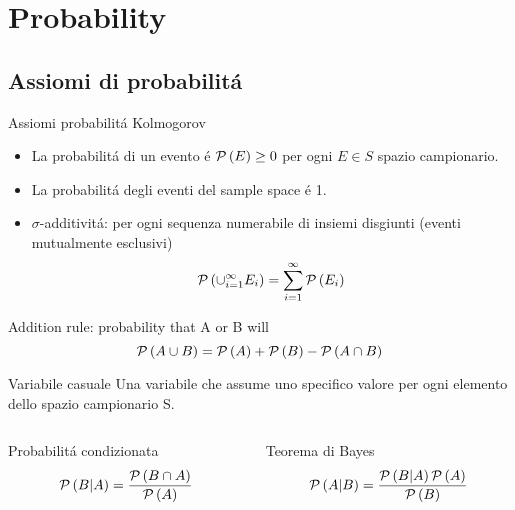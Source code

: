 \section{Probability}

\subsection{Assiomi di probabilit\'a}

\begin{frame}{Assiomi probabilit\'a Kolmogorov}
\begin{itemize}
\item La probabilit\'a di un evento \'e $\operatorname{\mathcal{P}}{(E)}\geq0$ per ogni $E\in S$ spazio campionario.
\item La probabilit\'a degli eventi del sample space \'e 1.
\item $\sigma$-additivit\'a: per ogni sequenza numerabile di insiemi disgiunti (eventi mutualmente esclusivi)
\begin{equation*}
\operatorname{\mathcal{P}}{(\cup_{i=1}^{\infty}E_i)}=\sum_{i=1}^{\infty}\operatorname{\mathcal{P}}{(E_i)}
\end{equation*}
\end{itemize}
\begin{block}{Addition rule: probability that A or B will}
\begin{equation*}
\operatorname{\mathcal{P}}{(A\cup B)}=\operatorname{\mathcal{P}}{(A)}+\operatorname{\mathcal{P}}{(B)}-\operatorname{\mathcal{P}}{(A\cap B)}
\end{equation*}
\end{block}
\begin{block}{Variabile casuale}
Una variabile che assume uno specifico valore per ogni elemento dello spazio campionario S.
\end{block}
\begin{columns}[T]
\begin{column}{0.5\textwidth}
\begin{block}{Probabilit\'a condizionata}
\begin{equation*}
\operatorname{\mathcal{P}}{(B|A)}=\frac{\operatorname{\mathcal{P}}{(B\cap A)}}{\operatorname{\mathcal{P}}{(A)}}
\end{equation*}
\end{block}
\end{column}
\begin{column}{0.5\textwidth}
\begin{block}{Teorema di Bayes}
\begin{equation*}
\operatorname{\mathcal{P}}{(A|B)}=\frac{\operatorname{\mathcal{P}}{(B|A)}\operatorname{\mathcal{P}}{(A)}}{\operatorname{\mathcal{P}}{(B)}}
\end{equation*}
\end{block}
\end{column}
\end{columns}
\end{frame}

